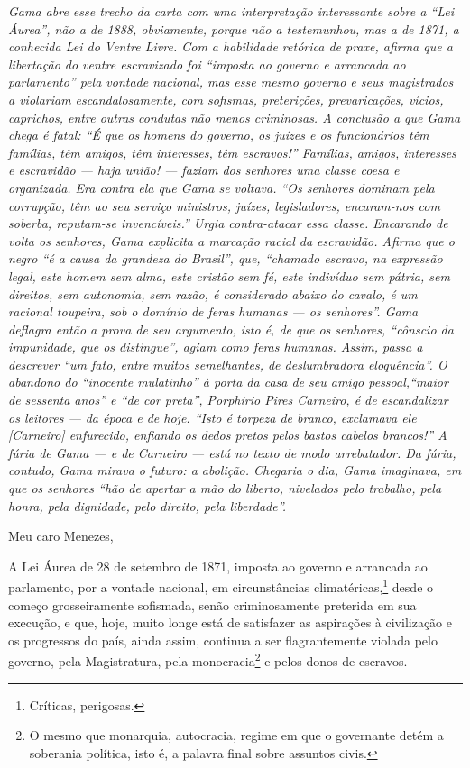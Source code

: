 {\begin{resumo}
\emph{Gama abre esse trecho da carta com uma interpretação interessante
sobre a ``Lei Áurea'', não a de 1888, obviamente, porque não a
testemunhou, mas a de 1871, a conhecida Lei do Ventre Livre. Com a
habilidade retórica de praxe, afirma que a libertação do ventre
escravizado foi ``imposta ao governo e arrancada ao parlamento'' pela
vontade nacional, mas esse mesmo governo e seus magistrados a violariam
escandalosamente, com sofismas, preterições, prevaricações, vícios,
caprichos, entre outras condutas não menos criminosas. A conclusão a que
Gama chega é fatal: ``É que os homens do governo, os juízes e os
funcionários têm famílias, têm amigos, têm interesses, têm escravos!''
Famílias, amigos, interesses e escravidão --- haja união! --- faziam dos
senhores uma classe coesa e organizada. Era contra ela que Gama se
voltava. ``Os senhores dominam pela corrupção, têm ao seu serviço
ministros, juízes, legisladores, encaram-nos com soberba, reputam-se
invencíveis.'' Urgia contra-atacar essa classe. Encarando de volta os
senhores, Gama explicita a marcação racial da escravidão. Afirma que o
negro ``é a causa da grandeza do Brasil'', que, ``chamado escravo, na
expressão legal, este homem sem alma, este cristão sem fé, este
indivíduo sem pátria, sem direitos, sem autonomia, sem razão, é
considerado abaixo do cavalo, é um racional toupeira, sob o domínio de
feras humanas --- os senhores''. Gama deflagra então a prova de seu
argumento, isto é, de que os senhores, ``cônscio da impunidade, que os
distingue'', agiam como feras humanas. Assim, passa a descrever ``um fato,
entre muitos semelhantes, de deslumbradora eloquência''. O abandono do
``inocente mulatinho'' à porta da casa de seu amigo pessoal,``maior de
sessenta anos'' e ``de cor preta'', Porphirio Pires Carneiro, é de
escandalizar os leitores --- da época e de hoje. ``Isto é torpeza de
branco, exclamava ele {[}Carneiro{]} enfurecido, enfiando os dedos
pretos pelos bastos cabelos brancos!'' A fúria de Gama --- e de Carneiro
--- está no texto de modo arrebatador. Da fúria, contudo, Gama mirava o
futuro: a abolição. Chegaria o dia, Gama imaginava, em que os senhores
``hão de apertar a mão do liberto, nivelados pelo trabalho, pela honra,
pela dignidade, pelo direito, pela liberdade''. }
\end{resumo}

Meu caro Menezes,

A Lei Áurea de 28 de setembro de 1871, imposta ao governo e arrancada ao
parlamento, por a vontade nacional, em circunstâncias
climatéricas,\footnote{Críticas, perigosas.} desde o começo
grosseiramente sofismada, senão criminosamente preterida em sua
execução, e que, hoje, muito longe está de satisfazer as aspirações à
civilização e os progressos do país, ainda assim, continua a ser
flagrantemente violada pelo governo, pela Magistratura, pela
monocracia\footnote{O mesmo que monarquia, autocracia, regime em que o
  governante detém a soberania política, isto é, a palavra final sobre
  assuntos civis.} e pelos donos de escravos.

}
